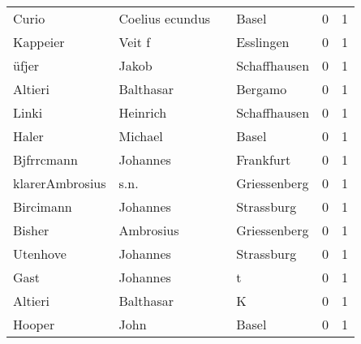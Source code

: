 \begin{tabular}{llllrr}
                    Curio &                    Coelius ecundus &             &                                       Basel &          0 &         1 \\
                 Kappeier &                             Veit f &             &                                   Esslingen &          0 &         1 \\
                    üfjer &                              Jakob &             &                                Schaffhausen &          0 &         1 \\
                  Altieri &                          Balthasar &             &                                     Bergamo &          0 &         1 \\
                    Linki &                           Heinrich &             &                                Schaffhausen &          0 &         1 \\
                    Haler &                            Michael &             &                                       Basel &          0 &         1 \\
               Bjfrrcmann &                           Johannes &             &                                   Frankfurt &          0 &         1 \\
          klarerAmbrosius &                               s.n. &             &                                Griessenberg &          0 &         1 \\
                Bircimann &                           Johannes &             &                                  Strassburg &          0 &         1 \\
                   Bisher &                          Ambrosius &             &                                Griessenberg &          0 &         1 \\
                 Utenhove &                           Johannes &             &                                  Strassburg &          0 &         1 \\
                     Gast &                           Johannes &             &                                           t &          0 &         1 \\
                  Altieri &                          Balthasar &             &                                           K &          0 &         1 \\
                   Hooper &                               John &             &                                       Basel &          0 &         1 \\

\end{tabular}

